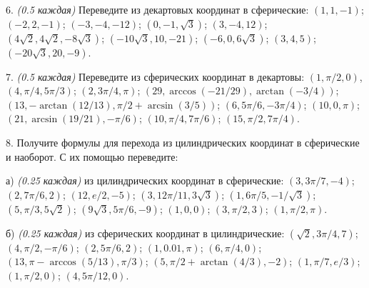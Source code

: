 \documentclass[14pt]{article}
\begin{document}
6. \textit{(0.5 каждая)} Переведите из декартовых координат в сферические: $(1,1,-1)$; $(-2,2,-1)$; $(-3,-4,-12)$; $(0,-1,\sqrt3)$; $(3,-4,12)$; $(4\sqrt2,4\sqrt2,-8\sqrt3)$; $(-10\sqrt3,10,-21)$; $(-6,0,6\sqrt3)$; $(3,4,5)$; $(-20\sqrt3,20,-9)$.

7. \textit{(0.5 каждая)} Переведите из сферических координат в декартовы: $(1,\pi/2,0)$, $(4,\pi/4,5\pi/3)$; $(2,3\pi/4,\pi)$; $(29,\arccos(-21/29),\arctan(-3/4))$; $(13,-\arctan(12/13),\pi/2+\arcsin(3/5))$; $(6,5\pi/6,-3\pi/4)$; $(10,0,\pi)$;\newline$(21,\arcsin(19/21),-\pi/6)$; $(10,\pi/4,7\pi/6)$; $(15,\pi/2,7\pi/4)$.

8. Получите формулы для перехода из цилиндрических координат в сферические и наоборот. С их помощью переведите:

а) \textit{(0.25 каждая)} из цилиндрических координат в сферические: $(3,3\pi/7,-4)$; $(2,7\pi/6,2)$; $(12,e/2,-5)$; $(3,12\pi/11,3\sqrt3)$; $(1,6\pi/5,-1/\sqrt3)$; $(5,\pi/3,5\sqrt2)$; $(9\sqrt3,5\pi/6,-9)$; $(1,0,0)$; $(3,\pi/2,3)$; $(1,\pi/2,\pi)$.

б) \textit{(0.25 каждая)} из сферических координат в цилиндрические: $(\sqrt2,3\pi/4,7)$; $(4,\pi/2,-\pi/6)$; $(2,5\pi/6,2)$; $(1,0.01,\pi)$; $(6,\pi/4,0)$; $(13,\pi-\arccos(5/13),\pi/3)$; $(5,\pi/2+\arctan(4/3),-2)$; $(1,\pi/7,e/3)$; $(1,\pi/2,0)$; $(4,5\pi/12,0)$.
\end{document}
